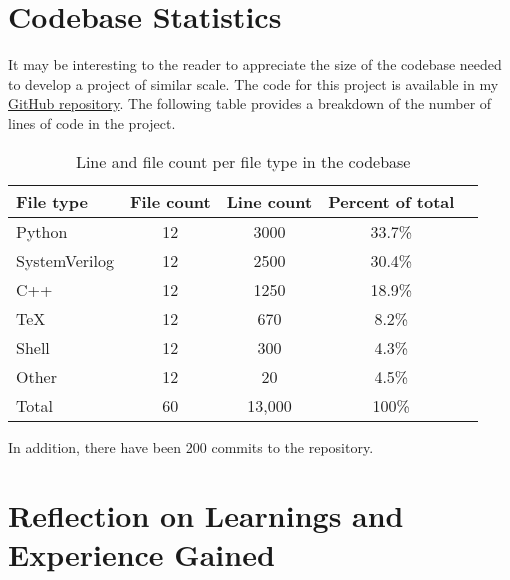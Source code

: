 \appendix
\section{Codebase Statistics}
It may be interesting to the reader to appreciate the size of the codebase needed to develop a project of similar scale. The code for this project is available 
in my \href{https://github.com/TristanRobitaille/engsci-thesis}{GitHub repository}. The following table provides a breakdown of the number of lines of code in the project.

\begin{table}[ht]
    \centering
    \renewcommand{\arraystretch}{1.2} %
    \setlength{\arrayrulewidth}{1.5pt} %
    \caption{Line and file count per file type in the codebase}
    \begin{tabular}{@{} p{4cm}cccr @{}}
        \toprule
        File type       & File count    & Line count    & Percent of total & \\\midrule
        Python          & 12            & 3000          & 33.7\% \\
        SystemVerilog   & 12            & 2500          & 30.4\% \\
        C++             & 12            & 1250          & 18.9\% \\
        TeX             & 12            & 670           & 8.2\%  \\
        Shell           & 12            & 300           & 4.3\%  \\
        Other           & 12            & 20            & 4.5\%  \\\midrule
        Total           & 60            & 13,000        & 100\%  \\
        \hline
    \end{tabular}
    \label{tab:line_cnt}
\end{table}

In addition, there have been 200 commits to the repository.

\newpage
\section{Reflection on Learnings and Experience Gained}